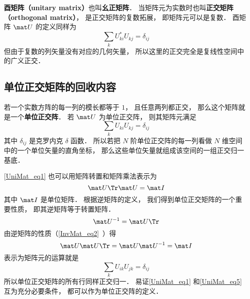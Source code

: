 
\begin{issues}
\issueDraft
{}
\end{issues}


\textbf{酉矩阵（unitary matrix）}也叫\textbf{幺正矩阵}． 当矩阵元为实数时也叫\textbf{正交矩阵（orthogonal matrix）}， 是正交矩阵的复数拓展， 即矩阵元可以是复数． 酉矩阵 $\mat U$ 的定义同样为
\begin{equation}
\sum_k U_{ki}^* U_{kj} = \delta_{ij}
\end{equation}
但由于复数的列矢量没有对应的几何矢量， 所以这里的正交完全是复线性空间中的广义正交．

\subsection{单位正交矩阵的回收内容}



若一个实数方阵的每一列的模长都等于 $1$， 且任意两列都正交， 那么这个矩阵就是一个\textbf{单位正交阵}． 若 $\mat U$ 为单位正交阵， 则其矩阵元满足
\begin{equation}\label{UniMat_eq1}
\sum_k U_{ki} U_{kj} = \delta_{ij}
\end{equation}
其中 $\delta_{ij}$ 是克罗内克 $\delta$ 函数． 所以若把 $N$ 阶单位正交阵的每一列看做 $N$ 维空间中的一个单位矢量的直角坐标， 那么这些单位矢量就组成该空间的一组正交归一基底．

\autoref{UniMat_eq1} 也可以用矩阵转置和矩阵乘法表示为
\begin{equation}
\mat U\Tr \mat U = \mat I
\end{equation}
其中 $\mat I$ 是单位矩阵． 根据逆矩阵的定义， 我们得到单位正交矩阵的一个重要性质， 即其逆矩阵等于转置矩阵．
\begin{equation}\label{UniMat_eq2}
\mat U^{-1} = \mat U\Tr
\end{equation}
由逆矩阵的性质（\autoref{InvMat_eq2}~）得
\begin{equation}
\mat U \mat U\Tr = \mat U \mat U^{-1} = \mat I
\end{equation}
表示为矩阵元的运算就是
\begin{equation}\label{UniMat_eq5}
\sum_k U_{ik} U_{jk} = \delta_{ij}
\end{equation}
所以单位正交矩阵的所有行同样正交归一． 易证\autoref{UniMat_eq1} 和\autoref{UniMat_eq5} 互为充分必要条件， 都可以作为单位正交阵的定义．

